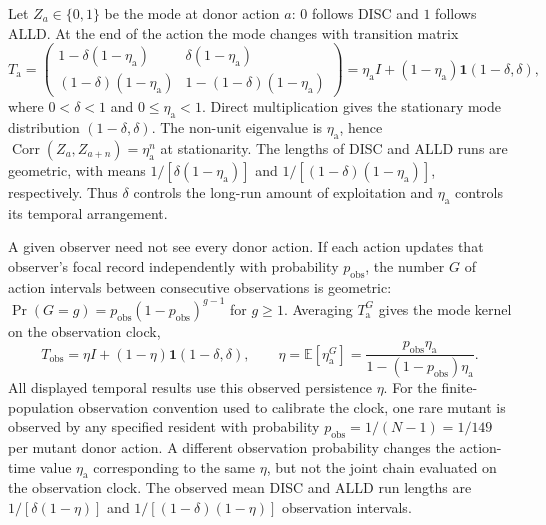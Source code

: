 \documentclass[fleqn,10pt]{wlscirep}
\begin{document}
Let $Z_a\in\{0,1\}$ be the mode at donor action $a$: $0$ follows DISC and $1$ follows ALLD. At the end of the action the mode changes with transition matrix
\begin{equation}
T_{\mathrm a}=\begin{pmatrix}
1-\delta(1-\eta_{\mathrm a}) & \delta(1-\eta_{\mathrm a})\\
(1-\delta)(1-\eta_{\mathrm a}) & 1-(1-\delta)(1-\eta_{\mathrm a})
\end{pmatrix}
=\eta_{\mathrm a}I+(1-\eta_{\mathrm a})\mathbf 1(1-\delta,\delta),
\label{eq:si-mode-transition-action}
\end{equation}
where $0<\delta<1$ and $0\leq\eta_{\mathrm a}<1$. Direct multiplication gives the stationary mode distribution $(1-\delta,\delta)$. The non-unit eigenvalue is $\eta_{\mathrm a}$, hence $\operatorname{Corr}(Z_a,Z_{a+n})=\eta_{\mathrm a}^{n}$ at stationarity. The lengths of DISC and ALLD runs are geometric, with means $1/[\delta(1-\eta_{\mathrm a})]$ and $1/[(1-\delta)(1-\eta_{\mathrm a})]$, respectively. Thus $\delta$ controls the long-run amount of exploitation and $\eta_{\mathrm a}$ controls its temporal arrangement.

A given observer need not see every donor action. If each action updates that observer's focal record independently with probability $p_{\mathrm{obs}}$, the number $G$ of action intervals between consecutive observations is geometric: $\Pr(G=g)=p_{\mathrm{obs}}(1-p_{\mathrm{obs}})^{g-1}$ for $g\geq1$. Averaging $T_{\mathrm a}^{G}$ gives the mode kernel on the observation clock,
\begin{equation}
T_{\mathrm{obs}}=\eta I+(1-\eta)\mathbf 1(1-\delta,\delta),
\qquad
\eta=\mathbb E[\eta_{\mathrm a}^{G}]
=\frac{p_{\mathrm{obs}}\eta_{\mathrm a}}{1-(1-p_{\mathrm{obs}})\eta_{\mathrm a}}.
\label{eq:si-observed-persistence}
\end{equation}
All displayed temporal results use this observed persistence $\eta$. For the finite-population observation convention used to calibrate the clock, one rare mutant is observed by any specified resident with probability $p_{\mathrm{obs}}=1/(N-1)=1/149$ per mutant donor action. A different observation probability changes the action-time value $\eta_{\mathrm a}$ corresponding to the same $\eta$, but not the joint chain evaluated on the observation clock. The observed mean DISC and ALLD run lengths are $1/[\delta(1-\eta)]$ and $1/[(1-\delta)(1-\eta)]$ observation intervals.
\end{document}
